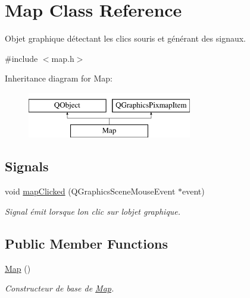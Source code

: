 \hypertarget{class_map}{}\section{Map Class Reference}
\label{class_map}


Objet graphique détectant les clics souris et générant des signaux.  




{\ttfamily \#include $<$map.\+h$>$}

Inheritance diagram for Map\+:\begin{figure}[H]
\begin{center}
\leavevmode
\includegraphics[height=2.000000cm]{class_map}
\end{center}
\end{figure}
\subsection*{Signals}
\begin{DoxyCompactItemize}
\item 
void \hyperlink{class_map_a43f303132cbb28cf95244e40aa030dbe}{map\+Clicked} (Q\+Graphics\+Scene\+Mouse\+Event $\ast$event)
\begin{DoxyCompactList}\small\item\em Signal émit lorsque l\textquotesingle{}on clic sur l\textquotesingle{}objet graphique. \end{DoxyCompactList}\end{DoxyCompactItemize}
\subsection*{Public Member Functions}
\begin{DoxyCompactItemize}
\item 
\hypertarget{class_map_a0f5ad0fd4563497b4214038cbca8b582}{}\hyperlink{class_map_a0f5ad0fd4563497b4214038cbca8b582}{Map} ()\label{class_map_a0f5ad0fd4563497b4214038cbca8b582}

\begin{DoxyCompactList}\small\item\em Constructeur de base de \hyperlink{class_map}{Map}. \end{DoxyCompactList}\end{DoxyCompactItemize}
